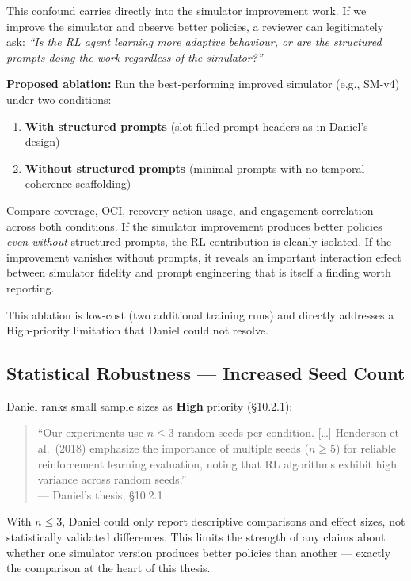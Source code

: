 \documentclass[11pt,a4paper]{article}
\begin{document}
This confound carries directly into the simulator improvement work. If we improve the simulator and observe better policies, a reviewer can legitimately ask: \textit{``Is the RL agent learning more adaptive behaviour, or are the structured prompts doing the work regardless of the simulator?''}

\textbf{Proposed ablation:} Run the best-performing improved simulator (e.g., SM-v4) under two conditions:

\begin{enumerate}
    \item \textbf{With structured prompts} (slot-filled prompt headers as in Daniel's design)
    \item \textbf{Without structured prompts} (minimal prompts with no temporal coherence scaffolding)
\end{enumerate}

\noindent Compare coverage, OCI, recovery action usage, and engagement correlation across both conditions. If the simulator improvement produces better policies \textit{even without} structured prompts, the RL contribution is cleanly isolated. If the improvement vanishes without prompts, it reveals an important interaction effect between simulator fidelity and prompt engineering that is itself a finding worth reporting.

This ablation is low-cost (two additional training runs) and directly addresses a High-priority limitation that Daniel could not resolve.


\subsection{Statistical Robustness --- Increased Seed Count}

Daniel ranks small sample sizes as \textbf{High} priority (\S10.2.1):

\begin{quote}
``Our experiments use $n \leq 3$ random seeds per condition. [\ldots] Henderson et al.\ (2018) emphasize the importance of multiple seeds ($n \geq 5$) for reliable reinforcement learning evaluation, noting that RL algorithms exhibit high variance across random seeds.''\\
--- Daniel's thesis, \S10.2.1
\end{quote}

With $n \leq 3$, Daniel could only report descriptive comparisons and effect sizes, not statistically validated differences. This limits the strength of any claims about whether one simulator version produces better policies than another --- exactly the comparison at the heart of this thesis.
\end{document}
